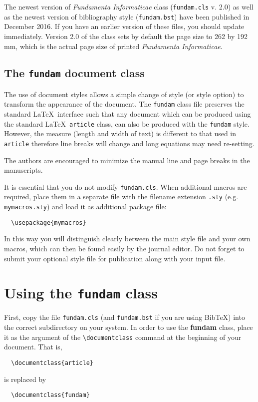 \documentclass{fundam}
\begin{document}
The newest version of \emph{Fundamenta Informaticae\/} class (\texttt{fundam.cls} v. 2.0) as well as the newest version of bibliography style (\texttt{fundam.bst}) have been published in December 2016. If you have an earlier version of these files, you should update immediately. Version 2.0 of the class sets by default the page size to 262 by 192 mm, which is the actual page size of printed \emph{Fundamenta Informaticae\/}.

\subsection{The \texttt{fundam} document class}

The use of document styles allows a simple change of style (or style
option) to transform the appearance of the document.  The
\texttt{fundam} class file preserves the standard \LaTeX\ interface
such that any document which can be produced using the standard
\LaTeX\ \texttt{article} class, can also be produced with the
\texttt{fundam} style.  However, the measure (length and width of text) is
different to that used in \texttt{article} therefore line breaks will
change and long equations may need re-setting.

The authors are encouraged to minimize the manual line and page breaks
in the manuscripts.

It is essential that you do not modify \texttt{fundam.cls}. When
additional macros are required, place them in a separate file with the
filename extension \texttt{.sty} (e.g. \texttt{mymacros.sty}) and load it
as additional package file:
\begin{verbatim}
  \usepackage{mymacros}
\end{verbatim}
In this way you will distinguish clearly between the main style file
and your own macros, which can then be found easily by the journal editor.
Do not forget to submit your optional style file for publication along
with your input file.


\section{Using the \texttt{fundam} class}

First, copy the file \texttt{fundam.cls} (and \texttt{fundam.bst} if
you are using Bib\TeX) into the correct subdirectory on your system.
In order to use the \textbf{fundam} class, place it as the argument of
the \verb|\documentclass| command at the beginning of your
document. That is,
\begin{verbatim}
  \documentclass{article}
\end{verbatim}
is replaced by
\begin{verbatim}
  \documentclass{fundam}
\end{verbatim}
\end{document}
